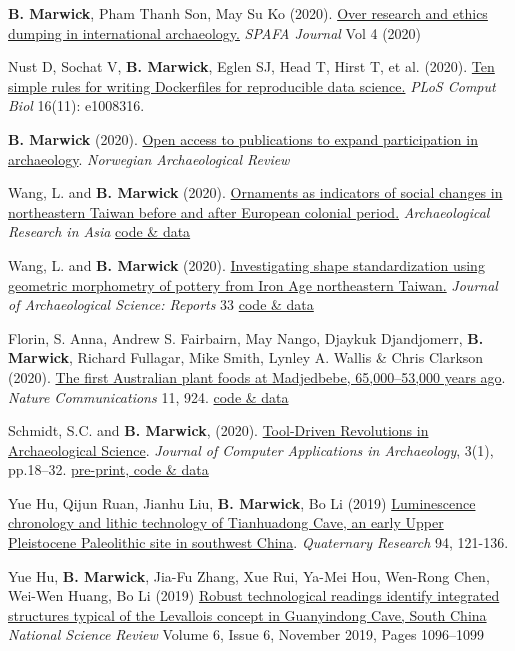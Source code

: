 \documentclass[11pt,article,oneside]{memoir}
\begin{document}
\ind  \textbf{B. Marwick}, Pham Thanh Son, May Su Ko (2020). \href{https://doi.org/10.26721/spafajournal.v4i0.625}{Over research and ethics dumping in international archaeology.} \textit{SPAFA Journal} Vol 4 (2020)

\ind Nust D, Sochat V, \textbf{B. Marwick}, Eglen SJ, Head T, Hirst T, et al. (2020). \href{https://doi.org/10.1371/journal.pcbi.1008316}{Ten simple rules for writing Dockerfiles for reproducible data science.} \textit{PLoS Comput Biol} 16(11): e1008316.

\ind \textbf{B. Marwick} (2020). \href{https://doi.org/10.1016/j.ara.2020.100226}{Open access to publications to expand participation in archaeology}. \textit{Norwegian Archaeological Review} 

\ind Wang, L. and \textbf{B. Marwick} (2020). \href{https://doi.org/10.1016/j.ara.2020.100226}{Ornaments as indicators of social changes in northeastern Taiwan before and after European colonial period.} \textit{Archaeological Research in Asia} \href{http://doi.org/10.17605/OSF.IO/R8YGA}{code \& data}

\ind Wang, L. and \textbf{B. Marwick} (2020). \href{https://doi.org/10.1016/j.jasrep.2020.102554}{Investigating shape standardization using geometric morphometry of pottery from Iron Age northeastern Taiwan.} \textit{Journal of Archaeological Science: Reports} 33 \href{https://osf.io/abvgf/}{code \& data}

\ind Florin, S. Anna, Andrew S. Fairbairn, May Nango, Djaykuk Djandjomerr, \textbf{B. Marwick}, Richard Fullagar, Mike Smith, Lynley A. Wallis \& Chris Clarkson (2020). \href{https://doi.org/10.1038/s41467-020-14723-0}{The first Australian plant foods at Madjedbebe, 65,000–53,000 years ago}. \textit{Nature Communications} 11, 924. \href{https://doi.org/10.17605/OSF.IO/YDUZP}{code \& data}

\ind Schmidt, S.C. and \textbf{B. Marwick}, (2020). \href{http://doi.org/10.5334/jcaa.29}{Tool-Driven Revolutions in Archaeological Science}. \textit{Journal of Computer Applications in Archaeology}, 3(1), pp.18–32. \href{https://doi.org/10.17605/OSF.IO/RHVN5}{pre-print, code \& data}

\ind Yue Hu, Qijun Ruan, Jianhu Liu, \textbf{B. Marwick}, Bo Li (2019) \href{http://doi.org/10.1017/qua.2019.67}{Luminescence chronology and lithic technology of Tianhuadong Cave, an early Upper Pleistocene Paleolithic site in southwest China}. \textit{Quaternary Research} 94, 121-136.

\ind Yue Hu, \textbf{B. Marwick}, Jia-Fu Zhang, Xue Rui, Ya-Mei Hou, Wen-Rong Chen, Wei-Wen Huang, Bo Li (2019) \href{https://doi.org/10.1093/nsr/nwz192}{Robust technological readings identify integrated structures typical of the Levallois concept in Guanyindong Cave, South China} \textit{National Science Review} Volume 6, Issue 6, November 2019, Pages 1096–1099 
\end{document}
